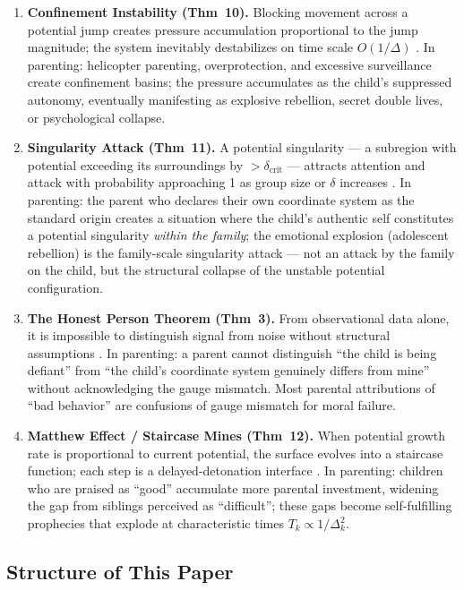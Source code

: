 \documentclass[11pt,a4paper]{article}
\begin{document}
\begin{enumerate}[label=\textbf{Thm~\arabic*.}, leftmargin=*]
    \item \textbf{Confinement Instability (Thm~10).} Blocking movement across a potential jump creates pressure accumulation proportional to the jump magnitude; the system inevitably destabilizes on time scale $O(1/\Delta)$ \cite{scx_moe_gauge}. In parenting: helicopter parenting, overprotection, and excessive surveillance create confinement basins; the pressure accumulates as the child's suppressed autonomy, eventually manifesting as explosive rebellion, secret double lives, or psychological collapse.
    \item \textbf{Singularity Attack (Thm~11).} A potential singularity — a subregion with potential exceeding its surroundings by $>\delta_{\text{crit}}$ — attracts attention and attack with probability approaching 1 as group size or $\delta$ increases \cite{scx_moe_gauge}. In parenting: the parent who declares their own coordinate system as the standard origin creates a situation where the child's authentic self constitutes a potential singularity \textit{within the family}; the emotional explosion (adolescent rebellion) is the family-scale singularity attack — not an attack by the family on the child, but the structural collapse of the unstable potential configuration.
    \item \textbf{The Honest Person Theorem (Thm~3).} From observational data alone, it is impossible to distinguish signal from noise without structural assumptions \cite{scx_thm3}. In parenting: a parent cannot distinguish ``the child is being defiant'' from ``the child's coordinate system genuinely differs from mine'' without acknowledging the gauge mismatch. Most parental attributions of ``bad behavior'' are confusions of gauge mismatch for moral failure.
    \item \textbf{Matthew Effect / Staircase Mines (Thm~12).} When potential growth rate is proportional to current potential, the surface evolves into a staircase function; each step is a delayed-detonation interface \cite{scx_moe_gauge}. In parenting: children who are praised as ``good'' accumulate more parental investment, widening the gap from siblings perceived as ``difficult''; these gaps become self-fulfilling prophecies that explode at characteristic times $T_k \propto 1/\Delta_k^2$.
\end{enumerate}

\subsection{Structure of This Paper}
\end{document}
